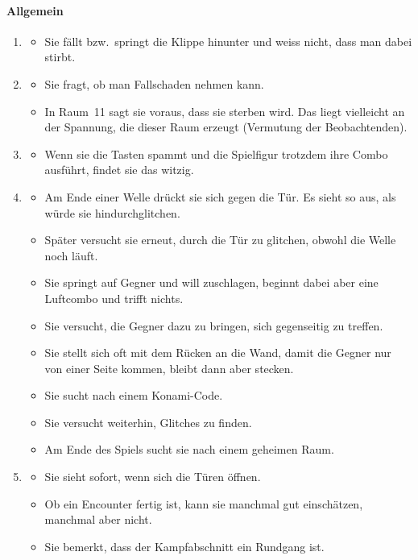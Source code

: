 \documentclass[../Main.tex]{subfiles}
\begin{document}
\paragraph{Allgemein}
\begin{enumerate}[label=\textbf{B\arabic*}, leftmargin=1.5cm, itemsep=0.8em, resume]
    \item
        \begin{itemize}[nosep]
            \item Sie fällt bzw.\ springt die Klippe hinunter und weiss nicht, dass man dabei stirbt.
        \end{itemize}
    \item
        \begin{itemize}[nosep]
            \item Sie fragt, ob man Fallschaden nehmen kann.
            \item In Raum~11 sagt sie voraus, dass sie sterben wird. Das liegt vielleicht an der Spannung, die dieser Raum erzeugt (Vermutung der Beobachtenden).
        \end{itemize}
    \item
        \begin{itemize}[nosep]
            \item Wenn sie die Tasten spammt und die Spielfigur trotzdem ihre Combo ausführt, findet sie das witzig.
        \end{itemize}
    \item
        \begin{itemize}[nosep]
            \item Am Ende einer Welle drückt sie sich gegen die Tür. Es sieht so aus, als würde sie hindurchglitchen.
            \item Später versucht sie erneut, durch die Tür zu glitchen, obwohl die Welle noch läuft.
            \item Sie springt auf Gegner und will zuschlagen, beginnt dabei aber eine Luftcombo und trifft nichts.
            \item Sie versucht, die Gegner dazu zu bringen, sich gegenseitig zu treffen.
            \item Sie stellt sich oft mit dem Rücken an die Wand, damit die Gegner nur von einer Seite kommen, bleibt dann aber stecken.
            \item Sie sucht nach einem Konami-Code.
            \item Sie versucht weiterhin, Glitches zu finden.
            \item Am Ende des Spiels sucht sie nach einem geheimen Raum.
        \end{itemize}
    \item
        \begin{itemize}[nosep]
            \item Sie sieht sofort, wenn sich die Türen öffnen.
            \item Ob ein Encounter fertig ist, kann sie manchmal gut einschätzen, manchmal aber nicht.
            \item Sie bemerkt, dass der Kampfabschnitt ein Rundgang ist.
        \end{itemize}
\end{enumerate}
\end{document}
